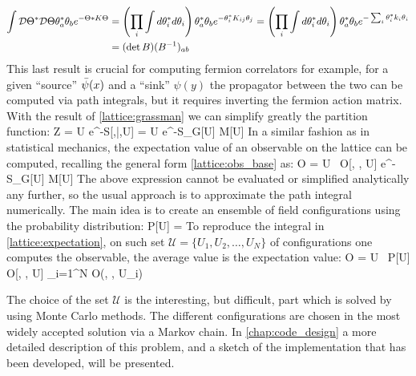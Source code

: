 \begin{align}
    \int \mathcal{D}\Theta^*\mathcal{D}\Theta \theta_a^*\theta_b e^{-\Theta* K \Theta } &= \left( \prod_i\int d\theta_i^*d\theta_i \right) \theta_a^*\theta_b e^{-\theta_i^* K_{ij} \theta_j } =  \left( \prod_i\int d\theta_i^*d\theta_i \right) \theta_a^*\theta_b e^{-\sum_i\theta_i^* k_i \theta_i } \\\nonumber
    &=  (\det B ) (B^{-1})_{ab}
\end{align}
This last result is crucial for computing fermion correlators for example, for a given ``source'' $\bar{\psi}(x)$ and a ``sink'' $\psi(y)$ the propagator between the two can be computed via path integrals, but it requires inverting the fermion action matrix. \\
With the result of \ref{lattice:grassman} we can simplify greatly the partition function:
\beq
	Z = \int \D\psi\D\bpsi\D U e^{-S[\psi,\bar{\psi},U] }  = \int \D U e^{-S_G[U] } \det M[U] 
\eeq
In a similar fashion as in statistical mechanics, the expectation value of an observable on the lattice can be computed, recalling the general form \cref{lattice:obs_base} as:
\beq
    \langle O \rangle =   \int \D U ~O[\psi, \bpsi, U] e^{-S_G[U] } \det M[U] 
    \label{lattice:expectation}
\eeq
The above expression cannot be evaluated or simplified analytically any further, so the usual approach is to approximate the path integral numerically. The main idea is to create an ensemble of field configurations using the probability distribution:
\beq
    P[U] = 
\eeq 
To reproduce the integral in \cref{lattice:expectation}, on such set $\mathcal{U} = \{ U_1, U_2, \dots,U_N \}$ of configurations one computes the observable, the average value is the expectation value:
\beq
\langle O \rangle =  \int \D U~ P[U] O[\psi, \bpsi, U] \approx {} \sum_{i=1}^N O(\psi, \bpsi, U_i) 
\eeq

The choice of the set $\mathcal{U}$ is the interesting, but difficult, part which is solved by using Monte Carlo methods. The different configurations are chosen in the most widely accepted solution via a Markov chain. In \cref{chap:code_design} a more detailed description of this problem, and a sketch of the implementation that has been developed, will be presented.

